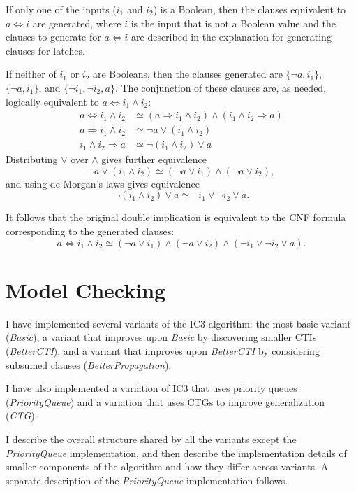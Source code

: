 \documentclass[12pt,a4paper,twoside,openright]{report}
\begin{document}
{If only one of the inputs ($i_1$ and $i_2$) is a Boolean, then the clauses equivalent to $a \Leftrightarrow i$
are generated, where $i$ is the input that is not a Boolean value and the clauses to generate for $a \Leftrightarrow i$ 
are described in the explanation for generating clauses for latches.

If neither of $i_1$ or $i_2$ are Booleans, then the clauses generated are
$\{\neg a, i_1\}$, $\{\neg a, i_1\}$, and
$\{\neg i_1,\neg i_2, a\}$. The conjunction of these clauses are, as needed,
logically equivalent to $a \Leftrightarrow i_1 \wedge i_2$:
\begin{align*}
a \Leftrightarrow i_1 \wedge i_2 &\simeq (a \Rightarrow i_1 \wedge i_2) \wedge (i_1 \wedge i_2 \Rightarrow a)\\
a \Rightarrow i_1 \wedge i_2 &\simeq \neg a \vee (i_1 \wedge i_2)\\
i_1 \wedge i_2 \Rightarrow a &\simeq \neg (i_1 \wedge i_2) \vee a
\end{align*}
Distributing $\vee$ over $\wedge$ gives further equivalence
$$\neg a \vee (i_1 \wedge i_2) \simeq
(\neg a \vee i_1) \wedge (\neg a \vee i_2),$$
and using de Morgan's laws gives equivalence
$$\neg (i_1 \wedge i_2) \vee a \simeq
\neg i_1 \vee \neg i_2 \vee a.$$

It follows that the original double implication is equivalent to the CNF
formula corresponding to the generated clauses:
$$a \Leftrightarrow i_1 \wedge i_2 \simeq
(\neg a \vee i_1) \wedge (\neg a \vee i_2) \wedge (\neg i_1 \vee \neg i_2 \vee a).$$


\section{Model Checking}
\label{impl:modelchecker}

I have implemented several variants of the IC3 algorithm:
the most basic variant (\emph{Basic}), a variant that
improves upon \emph{Basic} by discovering smaller CTIs (\emph{BetterCTI}),
and a variant that improves upon \emph{BetterCTI} by considering subsumed clauses
(\emph{BetterPropagation}).

I have also implemented a variation of IC3 that uses priority queues (\emph{PriorityQueue}) and a
variation that uses CTGs to improve generalization (\emph{CTG}).

I describe the overall structure shared by all the variants except the
\emph{PriorityQueue} implementation, and then describe the implementation
details of smaller components of the algorithm and how they differ across
variants. A separate description of the \emph{PriorityQueue} implementation
follows.

}
\end{document}
